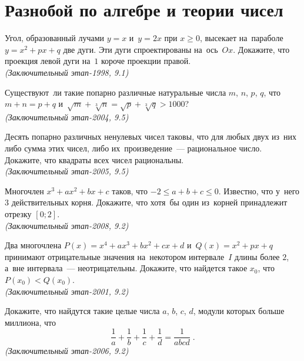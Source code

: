 
\section*{Разнобой по алгебре и теории чисел}


\begin{problems}

\item
Угол, образованный лучами $y = x$ и~$y = 2 x$ при $x \geq 0$, высекает
на~параболе $y = x^2 + px + q$ две дуги.
Эти дуги спроектированы на~ось~$Ox$.
Докажите, что проекция левой дуги на~$1$ короче проекции правой.
\\\emph{(Заключительный этап-1998, 9.1)}

\item
Существуют~ли такие попарно различные натуральные числа $m$, $n$, $p$, $q$, что
$m + n = p + q$ и~$\sqrt{m} + \sqrt[3]{n} = \sqrt{p} + \sqrt[3]{q} > 1000$?
\\\emph{(Заключительный этап-2004, 9.5)}

\item
Десять попарно различных ненулевых чисел таковы, что для любых двух из~них либо
сумма этих чисел, либо их~произведение~— рациональное число.
Докажите, что квадраты всех чисел рациональны.
\\\emph{(Заключительный этап-2005, 9.5)}

\item
Многочлен $x^3 + a x^2 + b x + c$ таков, что $-2 \leq a + b + c \leq 0$.
Известно, что у~него $3$ действительных корня.
Докажите, что хотя~бы один из~корней принадлежит отрезку $[0; 2]$.
\\\emph{(Заключительный этап-2008, 9.2)}

\item
Два многочлена $P(x) = x^4 + a x^3 + b x^2 + c x + d$ и~$Q(x) = x^2 + p x + q$
принимают отрицательные значения на~некотором интервале~$I$ длины более $2$,
а~вне интервала~— неотрицательны.
Докажите, что найдется такое $x_0$, что $P(x_0) < Q(x_0)$.
\\\emph{(Заключительный этап-2001, 9.2)}

\item
Докажите, что найдутся такие целые числа $a$, $b$, $c$, $d$, модули которых
больше миллиона, что
\[
    \frac{1}{a} + \frac{1}{b} + \frac{1}{c} + \frac{1}{d}
=
    \frac{1}{a b c d}
\; . \]
\emph{(Заключительный этап-2006, 9.2)}


\end{problems}
